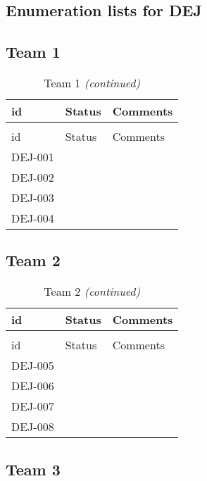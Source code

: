 \documentclass[]{article}
\author{}
\date{\vspace{-2.5em}}
\begin{document}
\hypertarget{enumeration-lists-for-dej}{%
\subsection{Enumeration lists for DEJ}\label{enumeration-lists-for-dej}}

\newpage

\hypertarget{team-1}{%
\subsection{Team 1}\label{team-1}}

\begin{longtable}[t]{l|l|>{\raggedright\arraybackslash}p{8cm}}
\caption{\label{tab:unnamed-chunk-6}Team 1}\\
\hline
id & Status & Comments\\
\hline
\endfirsthead
\caption[]{Team 1 \textit{(continued)}}\\
\hline
id & Status & Comments\\
\hline
\endhead
\rowcolor{gray!6}  DEJ-001 &  & \\
\hline
DEJ-002 &  & \\
\hline
\rowcolor{gray!6}  DEJ-003 &  & \\
\hline
DEJ-004 &  & \\
\hline
\end{longtable}
\newpage

\hypertarget{team-2}{%
\subsection{Team 2}\label{team-2}}

\begin{longtable}[t]{l|l|>{\raggedright\arraybackslash}p{8cm}}
\caption{\label{tab:unnamed-chunk-7}Team 2}\\
\hline
id & Status & Comments\\
\hline
\endfirsthead
\caption[]{Team 2 \textit{(continued)}}\\
\hline
id & Status & Comments\\
\hline
\endhead
\rowcolor{gray!6}  DEJ-005 &  & \\
\hline
DEJ-006 &  & \\
\hline
\rowcolor{gray!6}  DEJ-007 &  & \\
\hline
DEJ-008 &  & \\
\hline
\end{longtable}
\newpage

\hypertarget{team-3}{%
\subsection{Team 3}\label{team-3}}
\end{document}
